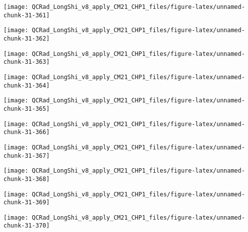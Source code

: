 \documentclass[
  10pt,
  a4paper,oneside]{article}
\begin{document}
\begin{center}\texttt{[image: QCRad\_LongShi\_v8\_apply\_CM21\_CHP1\_files/figure-latex/unnamed-chunk-31-361]} \end{center}

\begin{center}\texttt{[image: QCRad\_LongShi\_v8\_apply\_CM21\_CHP1\_files/figure-latex/unnamed-chunk-31-362]} \end{center}

\begin{center}\texttt{[image: QCRad\_LongShi\_v8\_apply\_CM21\_CHP1\_files/figure-latex/unnamed-chunk-31-363]} \end{center}

\begin{center}\texttt{[image: QCRad\_LongShi\_v8\_apply\_CM21\_CHP1\_files/figure-latex/unnamed-chunk-31-364]} \end{center}

\begin{center}\texttt{[image: QCRad\_LongShi\_v8\_apply\_CM21\_CHP1\_files/figure-latex/unnamed-chunk-31-365]} \end{center}

\begin{center}\texttt{[image: QCRad\_LongShi\_v8\_apply\_CM21\_CHP1\_files/figure-latex/unnamed-chunk-31-366]} \end{center}

\begin{center}\texttt{[image: QCRad\_LongShi\_v8\_apply\_CM21\_CHP1\_files/figure-latex/unnamed-chunk-31-367]} \end{center}

\begin{center}\texttt{[image: QCRad\_LongShi\_v8\_apply\_CM21\_CHP1\_files/figure-latex/unnamed-chunk-31-368]} \end{center}

\begin{center}\texttt{[image: QCRad\_LongShi\_v8\_apply\_CM21\_CHP1\_files/figure-latex/unnamed-chunk-31-369]} \end{center}

\begin{center}\texttt{[image: QCRad\_LongShi\_v8\_apply\_CM21\_CHP1\_files/figure-latex/unnamed-chunk-31-370]} \end{center}
\end{document}
